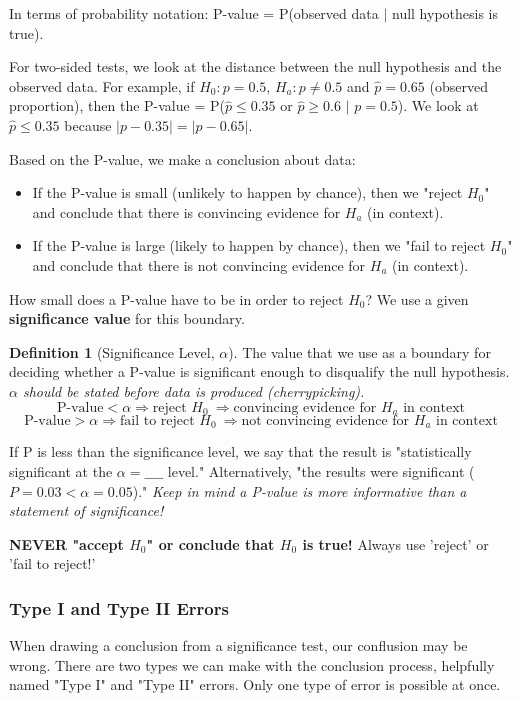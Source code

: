 \documentclass[12pt, a4paper]{article}
\theoremstyle{definition}
\newtheorem{definition}{Definition}
\begin{document}
In terms of probability notation: P-value = P(observed data $|$ null hypothesis is true).

For two-sided tests, we look at the distance between the null hypothesis and the observed data.
For example, if $H_0: p = 0.5$, $H_a: p \neq 0.5$ and $\hat{p} = 0.65$ (observed proportion), then the P-value = P($\hat{p} \leq 0.35$ or $\hat{p} \geq 0.6$ $|$  $p = 0.5$).
We look at $\hat{p} \leq 0.35$ because $|p - 0.35| = |p - 0.65|$.

Based on the P-value, we make a conclusion about data:
\begin{itemize}
    \item If the P-value is small (unlikely to happen by chance), then we "reject $H_0$" and conclude that there is convincing evidence for $H_a$ (in context).
    \item If the P-value is large (likely to happen by chance), then we "fail to reject $H_0$" and conclude that there is not convincing evidence for $H_a$ (in context).
\end{itemize}

How small does a P-value have to be in order to reject $H_0$? We use a given \textbf{significance value} for this boundary.

\begin{definition}[Significance Level, $\alpha$]
    The value that we use as a boundary for deciding whether a P-value is significant enough to disqualify the null hypothesis. \textit{$\alpha$ should be stated before data is produced (cherrypicking).}
    \[\textrm{P-value} < \alpha \Rightarrow \textrm{reject } H_0\ \Rightarrow \textrm{convincing evidence for $H_a$ in context}\]
    \[\textrm{P-value} > \alpha \Rightarrow \textrm{fail to reject } H_0\ \Rightarrow \textrm{not convincing evidence for $H_a$ in context}\]
\end{definition}

If P is less than the significance level, we say that the result is "statistically significant at the $\alpha = \_\_\_\_$ level."
Alternatively, "the results were significant ($P = 0.03 < \alpha = 0.05$)."
\textit{Keep in mind a P-value is more informative than a statement of significance!}

\textbf{NEVER "accept $H_0$" or conclude that $H_0$ is true!} Always use 'reject' or 'fail to reject!'

\subsubsection{Type I and Type II Errors}
When drawing a conclusion from a significance test, our conflusion may be wrong.
There are two types we can make with the conclusion process, helpfully named "Type I" and "Type II" errors. Only one type of error is possible at once.
\end{document}
